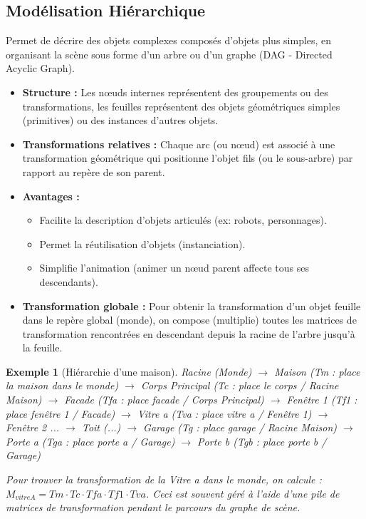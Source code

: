 \documentclass{article}
\newtheorem{example}{Exemple} %
\begin{document}
\subsection{Modélisation Hiérarchique}

Permet de décrire des objets complexes composés d'objets plus simples, en organisant la scène sous forme d'un arbre ou d'un graphe (DAG - Directed Acyclic Graph).
\begin{itemize}
    \item \textbf{Structure :} Les nœuds internes représentent des groupements ou des transformations, les feuilles représentent des objets géométriques simples (primitives) ou des instances d'autres objets.
    \item \textbf{Transformations relatives :} Chaque arc (ou nœud) est associé à une transformation géométrique qui positionne l'objet fils (ou le sous-arbre) par rapport au repère de son parent.
    \item \textbf{Avantages :}
        \begin{itemize}
            \item Facilite la description d'objets articulés (ex: robots, personnages).
            \item Permet la réutilisation d'objets (instanciation).
            \item Simplifie l'animation (animer un nœud parent affecte tous ses descendants).
        \end{itemize}
    \item \textbf{Transformation globale :} Pour obtenir la transformation d'un objet feuille dans le repère global (monde), on compose (multiplie) toutes les matrices de transformation rencontrées en descendant depuis la racine de l'arbre jusqu'à la feuille.
\end{itemize}

\begin{example}[Hiérarchie d'une maison]
Racine (Monde)
 $\to$ Maison (Tm : place la maison dans le monde)
    $\to$ Corps Principal (Tc : place le corps / Racine Maison)
        $\to$ Facade (Tfa : place facade / Corps Principal)
            $\to$ Fenêtre 1 (Tf1 : place fenêtre 1 / Facade)
                $\to$ Vitre a (Tva : place vitre a / Fenêtre 1)
            $\to$ Fenêtre 2 ...
        $\to$ Toit (...)
    $\to$ Garage (Tg : place garage / Racine Maison)
        $\to$ Porte a (Tga : place porte a / Garage)
        $\to$ Porte b (Tgb : place porte b / Garage)

Pour trouver la transformation de la Vitre a dans le monde, on calcule : $M_{vitreA} = Tm \cdot Tc \cdot Tfa \cdot Tf1 \cdot Tva$.
Ceci est souvent géré à l'aide d'une pile de matrices de transformation pendant le parcours du graphe de scène.
\end{example}
\end{document}
